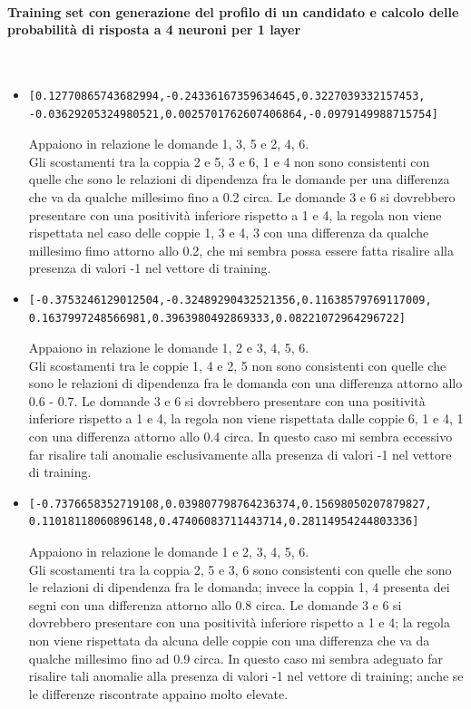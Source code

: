 \paragraph{Training set con generazione del profilo di un candidato e calcolo delle probabilit\`a di risposta a 4 neuroni per 1 layer}\mbox{}
\label{Training set con generazione del profilo di un candidato e calcolo delle probabilita di risposta a 4 neuroni per 1 layer}
\\
\noindent
\begin{itemize}
\item \begin{verbatim}[0.12770865743682994,-0.24336167359634645,0.3227039332157453,
-0.03629205324980521,0.0025701762607406864,-0.0979149988715754]
\end{verbatim}
Appaiono in relazione le domande 1, 3, 5 e 2, 4, 6.\\
Gli scostamenti tra la coppia 2 e 5, 3 e 6, 1 e 4 non sono consistenti con quelle che sono le relazioni di dipendenza fra le domande per una differenza  che va da qualche millesimo fino a 0.2 circa.
Le domande 3 e 6 si dovrebbero presentare con una positivit\`a inferiore rispetto a 1 e 4, la regola non viene rispettata nel caso delle coppie 1, 3 e 4, 3 con una differenza da qualche millesimo fimo attorno allo 0.2, che mi sembra possa essere fatta risalire alla presenza di valori -1 nel vettore di training.

\item \begin{verbatim}[-0.3753246129012504,-0.32489290432521356,0.11638579769117009,
0.1637997248566981,0.3963980492869333,0.08221072964296722]
\end{verbatim}
Appaiono in relazione le domande 1, 2 e 3, 4, 5, 6.\\
Gli scostamenti tra le coppie 1, 4 e 2, 5 non sono consistenti con quelle che sono le relazioni di dipendenza fra le domanda con una differenza attorno allo 0.6 - 0.7.
Le domande 3 e 6 si dovrebbero presentare con una positivit\`a inferiore rispetto a 1 e 4, la regola non viene rispettata dalle coppie 6, 1 e 4, 1 con una differenza attorno allo 0.4 circa. In questo caso mi sembra eccessivo far risalire tali anomalie esclusivamente alla presenza di valori -1 nel vettore di training.

\item \begin{verbatim}[-0.7376658352719108,0.039807798764236374,0.15698050207879827,
0.11018118060896148,0.47406083711443714,0.28114954244803336]
\end{verbatim}
Appaiono in relazione le domande 1 e 2, 3, 4, 5, 6.\\
Gli scostamenti tra la coppia 2, 5 e 3, 6 sono consistenti con quelle che sono le relazioni di dipendenza fra le domanda; invece la coppia 1, 4 presenta dei segni con una differenza attorno allo 0.8 circa.
Le domande 3 e 6 si dovrebbero presentare con una positivit\`a inferiore rispetto a 1 e 4; la regola non viene rispettata da alcuna delle coppie con una differenza che va da qualche millesimo fino ad 0.9 circa. In questo caso  mi sembra adeguato far risalire tali anomalie alla presenza di valori -1 nel vettore di training; anche se le differenze riscontrate appaino molto elevate.



\end{itemize}
